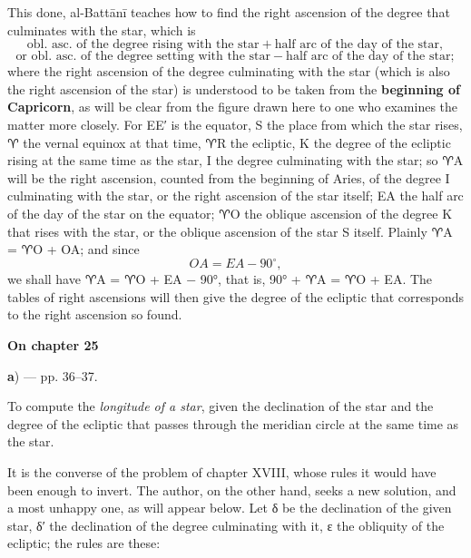 \documentclass[11pt]{article}
\newcommand{\UnitHead}[2]{\par\setcounter{footnoteT}{0}\needspace{8\baselineskip}\bigskip\pdfbookmark[1]{#1}{unit-#2}\hypertarget{EN-#2}{}%
 {\large\bfseries\interlinepenalty=10000 #1\par}\nobreak\medskip}
\begin{document}
\par This done, al-Battānī teaches how to find the right ascension of the degree that culminates with the star, which is \[ \text{obl. asc. of the degree rising with the star} + \text{half arc of the day of the star}, \] \[ \text{or obl. asc. of the degree setting with the star} - \text{half arc of the day of the star}; \] where the right ascension of the degree culminating with the star (which is also the right ascension of the star) is understood to be taken from the \textbf{beginning of Capricorn}, as will be clear from the figure drawn here to one who examines the matter more closely. For EE′ is the equator, S the place from which the star rises, {\MoonFont\upshape ♈} the vernal equinox at that time, {\MoonFont\upshape ♈}R the ecliptic, K the degree of the ecliptic rising at the same time as the star, I the degree culminating with the star; so {\MoonFont\upshape ♈}A will be the right ascension, counted from the beginning of Aries, of the degree I culminating with the star, or the right ascension of the star itself; EA the half arc of the day of the star on the equator; {\MoonFont\upshape ♈}O the oblique ascension of the degree K that rises with the star, or the oblique ascension of the star S itself. Plainly {\MoonFont\upshape ♈}A = {\MoonFont\upshape ♈}O + OA; and since \[ OA = EA - 90^\circ, \] we shall have {\MoonFont\upshape ♈}A = {\MoonFont\upshape ♈}O + EA − 90°, that is, 90° + {\MoonFont\upshape ♈}A = {\MoonFont\upshape ♈}O + EA. The tables of right ascensions will then give the degree of the ecliptic that corresponds to the right ascension so found.\par
\UnitHead{On chapter 25}{A25}
\par\begin{center}\textbf{a}) — pp. 36–37.\end{center}
\par To compute the \emph{longitude of a star}, given the declination of the star and the degree of the ecliptic that passes through the meridian circle at the same time as the star.\par
\par It is the converse of the problem of chapter XVIII, whose rules it would have been enough to invert. The author, on the other hand, seeks a new solution, and a most unhappy one, as will appear below. Let {\greekfont δ} be the declination of the given star, {\greekfont δ}′ the declination of the degree culminating with it, {\greekfont ε} the obliquity of the ecliptic; the rules are these:\par
\end{document}
